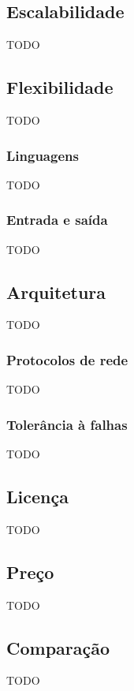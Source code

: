 \subsection{Escalabilidade}

TODO

\subsection{Flexibilidade}

TODO

\subsubsection{Linguagens}

TODO

\subsubsection{Entrada e saída}

TODO

\subsection{Arquitetura}

TODO

\subsubsection{Protocolos de rede}

TODO

\subsubsection{Tolerância à falhas}

TODO

\subsection{Licença}

TODO

\subsection{Preço}

TODO

\subsection{Comparação}

TODO
